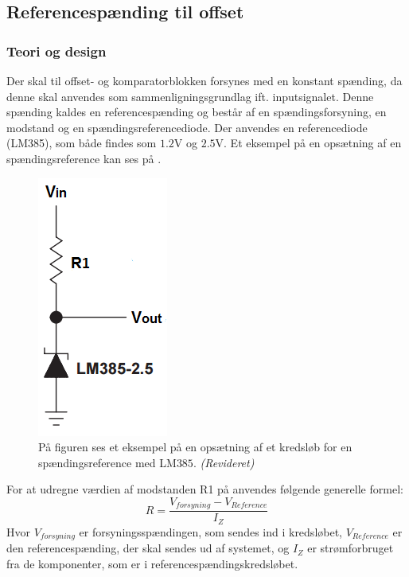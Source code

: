 \subsection{Referencespænding til offset}\label{subsec:Spaendingsref}
\subsubsection{Teori og design}
Der skal til offset- og komparatorblokken forsynes med en konstant spænding, da denne skal anvendes som sammenligningsgrundlag ift. inputsignalet. Denne spænding kaldes en referencespænding og består af en spændingsforsyning, en modstand og en spændingsreferencediode. Der anvendes en referencediode (LM385), som både findes som $1.2$V og $2.5$V. Et eksempel på en opsætning af en spændingsreference kan ses på .

\begin{figure}[H]
	\centering
	\includegraphics[scale=1.0]{figures/cProblemloesning/ReferenceEksempel.PNG}
	\caption{På figuren ses et eksempel på en opsætning af et kredsløb for en spændingsreference med LM$385$. \textit{(Revideret)} \cite{Instruments2005}}
	\label{fig:Spaendingsreference}
\end{figure}

\noindent For at udregne værdien af modstanden R1 på  anvendes følgende generelle formel:
\begin{equation}
R=\dfrac{V_{forsyning}-V_{Reference}}{I_{Z}}
\end{equation}
\noindent Hvor $V_{forsyning}$ er forsyningsspændingen, som sendes ind i kredsløbet, $V_{Reference}$ er den referencespænding, der skal sendes ud af systemet, og $I_{Z}$ er strømforbruget fra de komponenter, som er i referencespændingskredsløbet. \\

